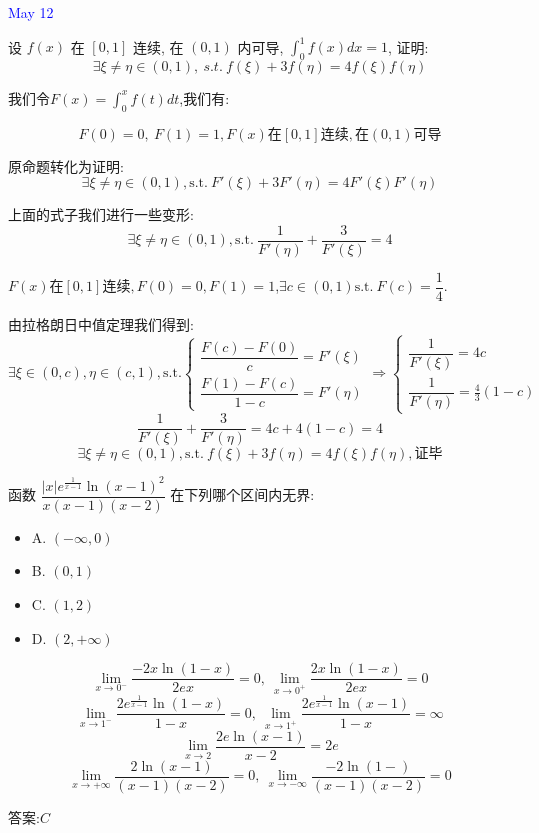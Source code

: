\textcolor{blue}{May 12}

\begin{example}[][Exam: 31.2.9]
	设 $f(x)$ 在 $[0,1]$ 连续, 在 $(0,1)$ 内可导,  $\int_{0}^{1}f(x)dx=1$, 证明: 
	$$\exists \xi\neq \eta\in(0,1),\ s.t.\ f(\xi)+3f(\eta)=4f(\xi)f(\eta)$$
\end{example}

\begin{solution}
	
	我们令$F(x)=\int_{0}^{x}f(t)dt$,我们有: 
	
	$$F(0)=0,\ F(1)=1,F(x)\text{在}[0,1]\text{连续},\text{在}(0,1)\text{可导}$$
	
	原命题转化为证明: 
	$$\exists \xi\neq \eta\in(0,1),\text{s.t.}\ F'(\xi)+3F'(\eta)=4F'(\xi)F'(\eta)$$
	
	上面的式子我们进行一些变形: 
	$$\exists \xi\neq \eta\in(0,1),\text{s.t.}\ \frac{1}{F'(\eta)}+\frac{3}{F'(\xi)}=4$$
	
	$F(x)\text{在}[0,1]\text{连续},F(0)=0,F(1)=1$,$\exists c\in(0,1)\text{s.t.}\ F(c)=\dfrac{1}{4}$.
	
	由拉格朗日中值定理我们得到: 
	$$\exists\xi\in(0,c),\eta\in(c,1), \text{s.t.}\left\lbrace 
	\begin{array}{l}
		\dfrac{F(c)-F(0)}{c}=F'(\xi)\\
		\dfrac{F(1)-F(c)}{1-c}=F'(\eta)
	\end{array}
	\right. \Rightarrow \left\lbrace 
	\begin{array}{l}
		\dfrac{1}{F'(\xi)}=4c\\
		\dfrac{1}{F'(\eta)}=\frac{4}{3}(1-c)
	\end{array}
	\right. $$
	$$\frac{1}{F'(\xi)}+\frac{3}{F'(\eta)}=4c+4(1-c)=4$$
	$$\exists \xi\neq \eta\in(0,1),\text{s.t.}\ f(\xi)+3f(\eta)=4f(\xi)f(\eta),\text{证毕}$$
\end{solution}

\begin{example}[][Exam: 31.2.10]
	函数 $\dfrac{|x|e^{\frac{1}{x-1}}\ln(x-1)^2}{x(x-1)(x-2)}$ 在下列哪个区间内无界: 
\begin{itemize}
	\item A. $(-\infty,0)$ 
	\item B. $(0,1)$ 
	\item C. $(1,2)$ 
	\item D. $(2,+\infty)$ 
\end{itemize}
\end{example}

\begin{solution}
	$$\lim\limits_{x\to 0^{-}}\frac{-2x\ln(1-x)}{2ex}=0,\ \lim\limits_{x\to 0^{+}}\frac{2x\ln(1-x)}{2ex}=0$$
	$$\lim\limits_{x\to 1^{-}}\frac{2e^{\frac{1}{x-1}}\ln(1-x)}{1-x}=0,\ \lim\limits_{x\to 1^{+}}\frac{2e^{\frac{1}{x-1}}\ln(x-1)}{1-x}=\infty$$
	$$\lim\limits_{x\to 2}\frac{2e\ln(x-1)}{x-2}=2e$$
	$$\lim\limits_{x\to +\infty}\frac{2\ln(x-1)}{(x-1)(x-2)}=0,\ \lim\limits_{x\to -\infty}\frac{-2\ln(1-)}{(x-1)(x-2)}=0$$
	
	答案:$C$
\end{solution}


